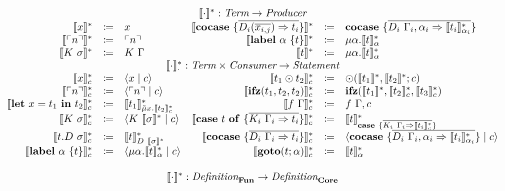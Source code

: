\[
  \begin{array}{rcl rcl}
    \multicolumn{6}{c}{\translatestar{\cdot}{} : \emph{Term} \rightarrow  \emph{Producer}}\\
    \translatestar{x}{} & \coloneqq & x &
    \translatestar{\cocase{\overline{D_i(\overline{x_{i,j}}) \Rightarrow t_i}}}{} & \coloneq & \cocase{\overline{D_i\ \Gamma_i,\alpha_i \Rightarrow \translatestar{t_i}{\alpha_i}}} \\
    \translatestar{\lit{n}}{} & \coloneqq & \lit{n}  &
    \translatestar{\lab{\alpha}{t}}{} & \coloneq & \mu \alpha.\translatestar{t}{\alpha}{} \\
    \translatestar{K\ \sigma}{} & \coloneqq & K\ \Gamma{} &
    \translatestar{t}{} & \coloneqq & \mu\alpha.\translatestar{t}{\alpha}
    \\
    \multicolumn{6}{c}{\translatestar{\cdot}{\cdot} : \emph{Term} \times \emph{Consumer} \rightarrow \emph{Statement}}\\
    \translatestar{x}{c} & \coloneq & \cut{x}{c} &
    \translatestar{t_1 \odot t_2}{c} & \coloneq & \odot(\translatestar{t_1}{}, \translatestar{t_2}{}; c)  \\
    \translatestar{\lit{n}}{c} & \coloneq & \cut{\lit{n}}{c} &
    \translatestar{\ifz{t_1}{t_2}{t_2}}{c} & \coloneq & \ifz{\translatestar{t_1}{}}{\translatestar{t_2}{c}}{\translatestar{t_3}{c}}  \\
    \translatestar{\letin{x}{t_1}{t_2}}{c} & \coloneq & \translatestar{t_1}{\tilde{\mu}x.\translatestar{t_2}{c}} &
    \translatestar{f\ \Gamma}{c} & \coloneq & f\ \Gamma,c \\
    \translatestar{K\ \sigma}{c} & \coloneq & \cut{K\ \translatestar{\sigma}{}}{c} &
    \translatestar{\caseof{t}{\overline{K_i\ \Gamma_i \Rightarrow t_i}}}{c} & \coloneq & \translatestar{t}{\case{\overline{K_i\ \Gamma_i \Rightarrow \translatestar{t_i}{c}}}} \\
    \translatestar{t.D\ \sigma}{c} & \coloneq & \translatestar{t}{D\ \translatestar{\sigma}{}} &
    \translatestar{\cocase{\overline{D_i\ \Gamma_i \Rightarrow t_i}}}{c} & \coloneq & \cut{\cocase{\overline{D_i\ \Gamma_i,\alpha_i \Rightarrow \translatestar{t_i}{\alpha_i}}}}{c}  \\
    \translatestar{\lab{\alpha}{t}}{c} & \coloneq & \cut{\mu \alpha.\translatestar{t}{\alpha}}{c} &
    \translatestar{\goto{t}{\alpha}}{c} & \coloneq & \translatestar{t}{\alpha} \\
    \\
    \multicolumn{6}{c}{\translatestar{\cdot}{} : \emph{Definition}_{\surfacelang{}} \rightarrow \emph{Definition}_{\targetlang{}}}\\

\end{array}\]
